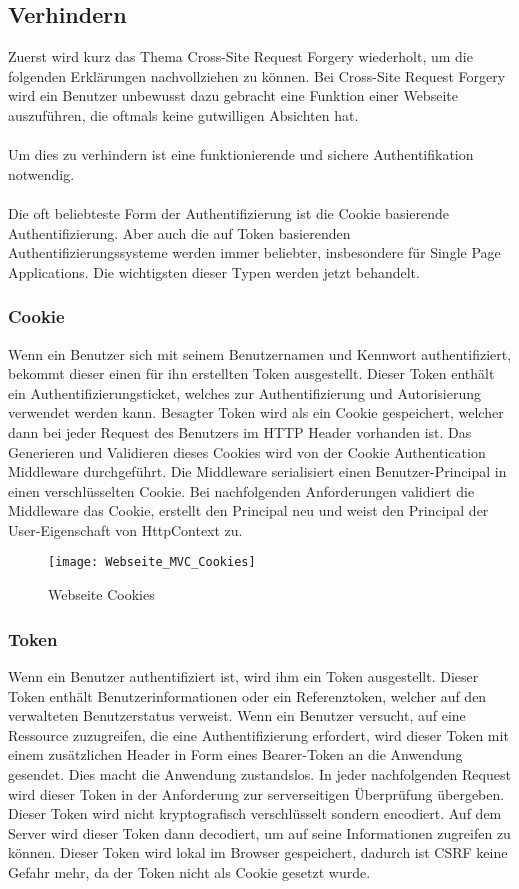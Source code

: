 {\subsection{Verhindern}
\label{sec:xsrf_prevent}
Zuerst wird kurz das Thema Cross-Site Request Forgery wiederholt, um die folgenden Erklärungen nachvollziehen zu können. Bei Cross-Site Request Forgery wird ein Benutzer unbewusst dazu gebracht eine Funktion einer Webseite auszuführen, die oftmals keine gutwilligen Absichten hat.\\ \\Um dies zu verhindern ist eine funktionierende und sichere Authentifikation notwendig. \\ \\Die oft beliebteste Form der Authentifizierung ist die Cookie basierende Authentifizierung. Aber auch die auf Token basierenden Authentifizierungssysteme werden immer beliebter, insbesondere für Single Page Applications. Die wichtigsten dieser Typen werden jetzt behandelt.
\subsubsection{Cookie}
Wenn ein Benutzer sich mit seinem Benutzernamen und Kennwort authentifiziert, bekommt dieser einen für ihn erstellten Token ausgestellt. Dieser Token enthält ein Authentifizierungsticket, welches zur Authentifizierung und Autorisierung verwendet werden kann. Besagter Token wird als ein Cookie gespeichert, welcher dann bei jeder Request des Benutzers im HTTP Header vorhanden ist. Das Generieren und Validieren dieses Cookies wird von der Cookie Authentication Middleware durchgeführt. Die Middleware serialisiert einen Benutzer-Principal in einen verschlüsselten Cookie. Bei nachfolgenden Anforderungen validiert die Middleware das Cookie, erstellt den Principal neu und weist den Principal der User-Eigenschaft von HttpContext zu.
\begin{figure}[H]
    \texttt{[image: Webseite\_MVC\_Cookies]}
    \caption{Webseite Cookies}
    \label{fig:webcookies}
\end{figure}
\subsubsection{Token}
Wenn ein Benutzer authentifiziert ist, wird ihm ein Token ausgestellt. Dieser Token enthält Benutzerinformationen oder ein Referenztoken, welcher auf den verwalteten Benutzerstatus verweist. Wenn ein Benutzer versucht, auf eine Ressource zuzugreifen, die eine Authentifizierung erfordert, wird dieser Token mit einem zusätzlichen Header in Form eines Bearer-Token an die Anwendung gesendet. Dies macht die Anwendung zustandslos. In jeder nachfolgenden Request wird dieser Token in der Anforderung zur serverseitigen Überprüfung übergeben. Dieser Token wird nicht kryptografisch verschlüsselt sondern encodiert. Auf dem Server wird dieser Token dann decodiert, um auf seine Informationen zugreifen zu können. Dieser Token wird lokal im Browser gespeichert, dadurch ist CSRF keine Gefahr mehr, da der Token nicht als Cookie gesetzt wurde.
}
